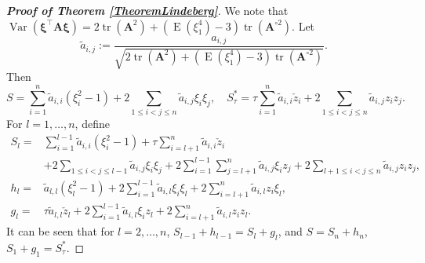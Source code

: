 \documentclass[smallextended]{svjour3}       %
\DeclareMathOperator{\mytr}{tr}
\DeclareMathOperator{\myE}{E}
\DeclareMathOperator{\myVar}{Var}
\newcommand{\BA}{\mathbf{A}}    \newcommand{\BB}{\mathbf{B}}    \newcommand{\BC}{\mathbf{C}}    \newcommand{\BD}{\mathbf{D}}    \newcommand{\BE}{\mathbf{E}}    \newcommand{\BF}{\mathbf{F}}    \newcommand{\BG}{\mathbf{G}}    \newcommand{\BH}{\mathbf{H}}    \newcommand{\BI}{\mathbf{I}}    \newcommand{\BJ}{\mathbf{J}}    \newcommand{\BK}{\mathbf{K}}    \newcommand{\BL}{\mathbf{L}}
\newcommand{\bfsym}[1]{\ensuremath{\boldsymbol{#1}}}
\def\bxi{\bfsym {\xi}}
\begin{document}
\begin{proof}[\textbf{Proof of Theorem \ref{TheoremLindeberg}}]
    We note that $\myVar(\bxi^\top \BA \bxi)=
    2\mytr(\BA^2)
    +
    (\myE(\xi_1^4)-3)\mytr(\BA^{\circ 2} )
    $.
    Let
    \begin{equation*}
        \tilde a_{i,j}:=
        \frac{a_{i,j}}{
            \sqrt{
    2\mytr(\BA^2)
    +
    (\myE(\xi_1^4)-3)\mytr(\BA^{\circ 2} )
            }             
        }
        .
    \end{equation*}
Then
    \begin{equation*}
        S=\sum_{i=1}^n \tilde a_{i,i}(\xi_i^2-1)
        +2\sum_{1\leq i < j \leq n}  \tilde a_{i,j} \xi_i \xi_j,
\quad
        S_\tau^* =\tau \sum_{i=1}^n \tilde a_{i,i}\check z_i
        +2\sum_{1\leq i <j \leq n} \tilde a_{i,j} z_i z_j.
    \end{equation*}
    For $l=1,\ldots, n$, define
    \begin{align*}
        S_l = & 
        \sum_{i=1}^{l-1} \tilde a_{i,i}(\xi_i^2-1)
        +
        \tau\sum_{i=l+1}^{n} \tilde a_{i,i}  \check  z_i
        \\
        &+2\sum_{1\leq i <j \leq l-1}  \tilde a_{i,j} \xi_i \xi_j
        +2\sum_{i=1}^{l-1} \sum_{j=l+1}^n \tilde a_{i,j} \xi_i z_j
        +2\sum_{l+1 \leq i < j \leq n}  \tilde a_{i,j} z_i z_j
        ,
        \\
        h_l = & \tilde a_{l,l} (\xi_l^2 -1)
        +2\sum_{i=1}^{l-1} \tilde a_{i,l} \xi_i \xi_l
        +2\sum_{i =l +1}^n \tilde a_{i,l} z_i \xi_l
        ,
        \\
        g_l = &
        \tau \tilde a_{l,l} \check z_l
        +2\sum_{i =1}^{l-1} \tilde a_{i,l} \xi_i z_l
        +2\sum_{i = l+1}^n \tilde a_{i,l} z_i z_l
        .
    \end{align*}
    It can be seen that for $l=2,\ldots, n$, 
    $S_{l-1}+ h_{l-1} =S_{l} + g_{l} $, and
    $S=S_n + h_n$, $S_1 + g_1=S_\tau^*$.


\end{proof}
\end{document}
